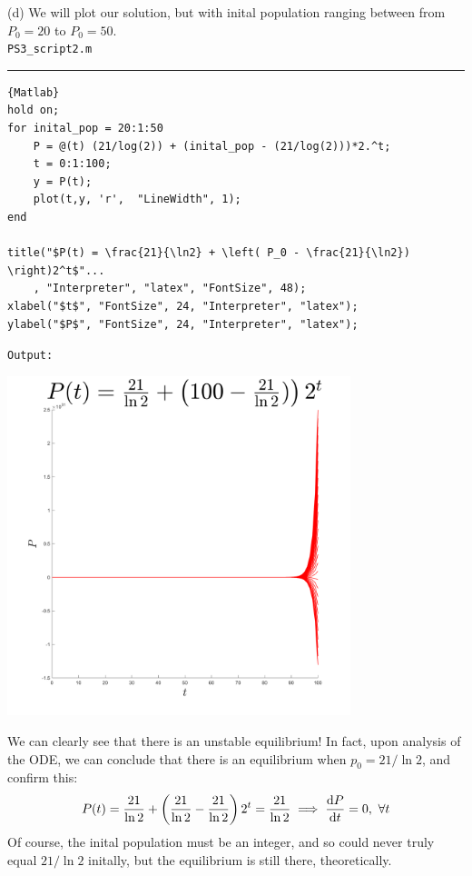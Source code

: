 \documentclass[a4paper, 11pt]{report}
\begin{document}
\pagebreak
\sol (d) We will plot our solution, but with inital population ranging between from $P_0=20$ to $P_0=50$.\\
\verb|PS3_script2.m| \hrule
\begin{lstlisting}{Matlab}
hold on;
for inital_pop = 20:1:50
	P = @(t) (21/log(2)) + (inital_pop - (21/log(2)))*2.^t;
	t = 0:1:100;
	y = P(t);
	plot(t,y, 'r',  "LineWidth", 1);
end

title("$P(t) = \frac{21}{\ln2} + \left( P_0 - \frac{21}{\ln2}) \right)2^t$"...
	, "Interpreter", "latex", "FontSize", 48);
xlabel("$t$", "FontSize", 24, "Interpreter", "latex");
ylabel("$P$", "FontSize", 24, "Interpreter", "latex");
\end{lstlisting}
\verb|Output:|\\
\begin{center}
	\includegraphics[width=0.75\textwidth]{PS3_fig2.png}
\end{center}
We can clearly see that there is an unstable equilibrium! In fact, upon analysis of the ODE, we can conclude that there is an equilibrium when $p_0=21/\ln2$, and confirm this:
$$
	P(t) = \frac{21}{\ln2} + \bracks{\frac{21}{\ln2} - \frac{21}{\ln2}}2^t = \frac{21}{\ln2} \implies \dyd[P]{t}=0,\ \forall t
$$
Of course, the inital population must be an integer, and so could never truly equal $21/\ln2$ initally, but the equilibrium is still there, theoretically.
\end{document}
